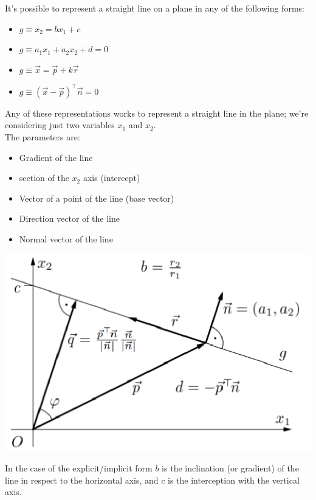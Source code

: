 It's possible to represent a straight line on a plane in any of the following forms:
\begin{itemize}
	\item {} $g \equiv x_2 = b x_1 + c$
	
	\item {} $g \equiv a_1 x_1 + a_2 x_2 + d = 0$
	
	\item {} $ g \equiv  \vec{x} = \vec{p} + k \vec{r} $
	
	\item {} $ g \equiv  \left(\vec{x} - \vec{p}\right)^{\top} \vec{n} = 0 $
\end{itemize}

Any of these representations works to represent a straight line in the plane; we're considering just two variables $x_1$ and $x_2$.\\

The parameters are: 
\begin{itemize}
	\item {} Gradient of the line
	\item {} section of the $x_2$ axis (intercept)
	\item {} Vector of a point of the line (base vector)
	\item {} Direction vector of the line
	\item {} Normal vector of the line
\end{itemize}

\begin{center}
	\includegraphics[width=0.5\columnwidth]{img/NN/GeomInt1}
\end{center}

In the case of the explicit/implicit form $b$ is the inclination (or gradient) of the line in respect to the horizontal axis, and $c$ is the interception with the vertical axis.\\

